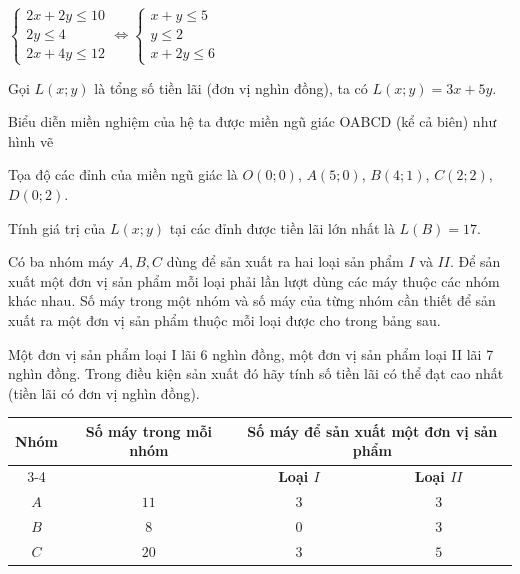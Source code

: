 \begin{ex}
{$\begin{cases} 
2 x + 2 y \leq 1 0 \\ 
2 y \leq 4 \\
2 x + 4 y \leq 1 2 
\end{cases}
 \Leftrightarrow \begin{cases}
x+y \leq 5 \\
y \leq 2 \\
x+2 y \leq 6 
\end{cases}$

Gọi $L(x; y)$ là tổng số tiền lãi (đơn vị nghìn đồng), ta có $L(x; y)=3x+5y$.

Biểu diễn miền nghiệm của hệ ta được miền ngũ giác OABCD (kể cả biên) như hình vẽ

Tọa độ các đỉnh của miền ngũ giác là $O(0;0)$, $A(5;0)$, $B(4;1)$, $C(2;2)$, $D(0;2)$.

Tính giá trị của $L(x; y)$ tại các đỉnh được tiền lãi lớn nhất là  $L(B)=17$. 
 }\end{ex}

\begin{ex}
 Có ba nhóm máy ${A,B,C}$ dùng để sản xuất ra hai loại sản phẩm ${I}$ và ${II}$. Để sản xuất một đơn vị sản phẩm mỗi loại phải lần lượt dùng các máy thuộc các nhóm khác nhau. Số máy trong một nhóm và số máy của từng nhóm cần thiết để sản xuất ra một đơn vị sản phẩm thuộc mỗi loại được cho trong bảng sau.

Một đơn vị sản phẩm loại I lãi 6 nghìn đồng, một đơn vị sản phẩm loại II lãi 7 nghìn đồng. Trong điều kiện sản xuất đó hãy tính số tiền lãi có thể đạt cao nhất (tiền lãi có đơn vị nghìn đồng).
\begin{center}
\begin{tabular}{|c|c|c|c|}
\hline
\textbf{Nhóm} & \textbf{Số máy trong mỗi nhóm} & \multicolumn{2}{c|}{\textbf{Số máy để sản xuất một đơn vị sản phẩm}} \\ \cline{3-4}
& & \textbf{Loại $I$} & \textbf{Loại $II$} \\ \hline
$A$ & $11$ & $3$ & $3$ \\ \hline
$B$ & $8$ & $0$ & $3$ \\ \hline
$C$ & $20$ & $3$ & $5$ \\ \hline
\end{tabular}

\end{center}


\end{ex}

